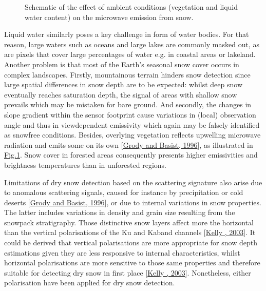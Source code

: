 \documentclass[letterpaper,10pt,english]{jupyterBook}
\let\sphinxpxdimen\pdfpxdimen\else\newdimen\sphinxpxdimen
\begin{document}
\begin{figure}[htbp]
\centering
\capstart

\noindent\sphinxincludegraphics[width=350\sphinxpxdimen]{{emission-ambient}.png}
\caption{Schematic of the effect of ambient conditions (vegetation and liquid water content) on the microwave emission from snow.}\label{\detokenize{book/introduction_purpose_scope:emission-ambient}}\end{figure}

\sphinxAtStartPar
Liquid water similarly poses a key challenge in form of water bodies.
For that reason, large waters such as oceans and large lakes are commonly masked out, as are pixels that cover large percentages of water e.g. in coastal areas or lakeland.
Another problem is that most of the Earth’s seasonal snow cover occurs in complex landscapes.
Firstly, mountainous terrain hinders snow detection since large spatial differences in snow depth are to be expected: whilst deep snow eventually reaches saturation depth, the signal of areas with shallow snow prevails which may be mistaken for bare ground.
And secondly, the changes in slope gradient within the sensor footprint cause variations in (local) observation angle and thus in view\sphinxhyphen{}dependent emissivity which again may be falsely identified as snow\sphinxhyphen{}free conditions.
Besides, overlying vegetation reflects upwelling microwave radiation and emits some on its own {[}\hyperlink{cite.book/references:id9}{Grody and Basist, 1996}{]}, as illustrated in \hyperref[\detokenize{book/introduction_purpose_scope:emission-ambient}]{Fig.\@ \ref{\detokenize{book/introduction_purpose_scope:emission-ambient}}}.
Snow cover in forested areas consequently presents higher emissivities and brightness temperatures than in unforested regions.

\sphinxAtStartPar
Limitations of dry snow detection based on the scattering signature also arise due to anomalous scattering signals, caused for instance by precipitation or cold deserts {[}\hyperlink{cite.book/references:id9}{Grody and Basist, 1996}{]}, or due to internal variations in snow properties.
The latter includes variations in density and grain size resulting from the snowpack stratigraphy.
Those distinctive snow layers affect more the horizontal than the vertical polarisations of the Ku and Ka\sphinxhyphen{}band channels {[}\hyperlink{cite.book/references:id16}{Kelly , 2003}{]}.
It could be derived that vertical polarisations are more appropriate for snow depth estimations given they are less responsive to internal characteristics, whilst horizontal polarisations are more sensitive to those same properties and therefore suitable for detecting dry snow in first place {[}\hyperlink{cite.book/references:id16}{Kelly , 2003}{]}.
Nonetheless, either polarisation have been applied for dry snow detection.
\end{document}
